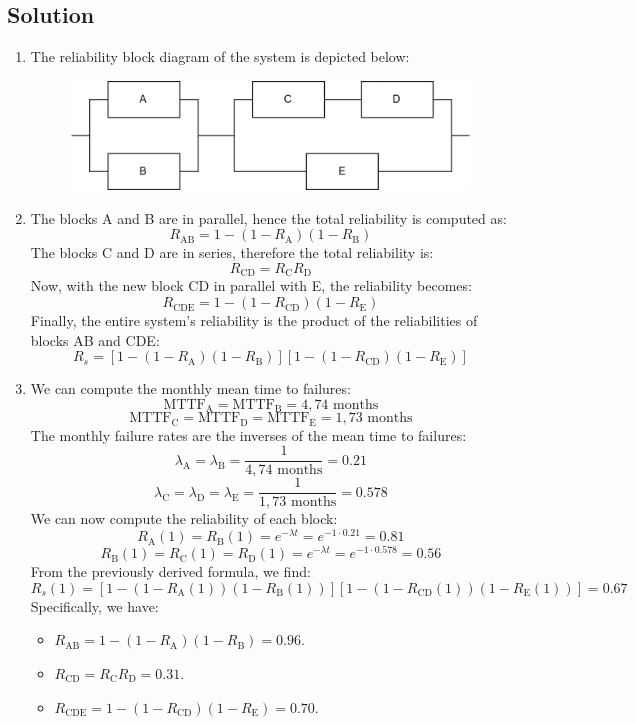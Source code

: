 \subsection*{Solution}
\begin{enumerate}
    \item The reliability block diagram of the system is depicted below:
        \begin{figure}[H]
            \centering
            \includegraphics[width=0.6\linewidth]{images/rbd.png}
        \end{figure}
    \item The blocks A and B are in parallel, hence the total reliability is computed as:
        \[R_{\text{AB}}=1-\left(1-R_\text{A}\right)\left(1-R_\text{B}\right)\]
        The blocks C and D are in series, therefore the total reliability is:
        \[R_{\text{CD}}=R_\text{C}R_\text{D}\]
        Now, with the new block CD in parallel with E, the reliability becomes:
        \[R_{\text{CDE}}=1-\left(1-R_\text{CD}\right)\left(1-R_\text{E}\right)\]
        Finally, the entire system's reliability is the product of the reliabilities of blocks AB and CDE:
        \[R_{s}=\left[1-\left(1-R_\text{A}\right)\left(1-R_\text{B}\right)\right]\left[1-\left(1-R_\text{CD}\right)\left(1-R_\text{E}\right)\right]\]
    \item We can compute the monthly mean time to failures:
        \[\text{MTTF}_{\text{A}}=\text{MTTF}_{\text{B}}=4,74 \text{ months}\]
        \[\text{MTTF}_{\text{C}}=\text{MTTF}_{\text{D}}=\text{MTTF}_{\text{E}}=1,73 \text{ months}\]
        The monthly failure rates are the inverses of the mean time to failures:
        \[\lambda_{\text{A}}=\lambda_{\text{B}}=\dfrac{1}{4,74 \text{ months}}=0.21\]
        \[\lambda_{\text{C}}=\lambda_{\text{D}}=\lambda_{\text{E}}=\dfrac{1}{1,73 \text{ months}}=0.578\]
        We can now compute the reliability of each block:
        \[R_{\text{A}}(1)=R_{\text{B}}(1)=e^{-\lambda t}=e^{-1\cdot 0.21}=0.81\]
        \[R_{\text{B}}(1)=R_{\text{C}}(1)=R_{\text{D}}(1)=e^{-\lambda t}=e^{-1\cdot 0.578}=0.56\]
        From the previously derived formula, we find:
        \[R_{s}(1)=\left[1-\left(1-R_\text{A}(1)\right)\left(1-R_\text{B}(1)\right)\right]\left[1-\left(1-R_\text{CD}(1)\right)\left(1-R_\text{E}(1)\right)\right]=0.67\]
        Specifically, we have:
        \begin{itemize}
            \item $R_{\text{AB}}=1-\left(1-R_\text{A}\right)\left(1-R_\text{B}\right)=0.96$.
            \item $R_{\text{CD}}=R_\text{C}R_\text{D}=0.31$.
            \item $R_{\text{CDE}}=1-\left(1-R_\text{CD}\right)\left(1-R_\text{E}\right)=0.70$.
        \end{itemize}
\end{enumerate}